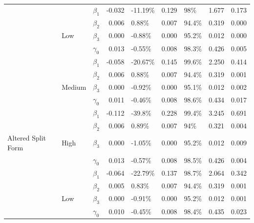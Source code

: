 \documentclass{svjour3}\usepackage[]{graphicx}\usepackage[]{color}
\newenvironment{knitrout}{}{} %
\begin{document}
\begin{knitrout}
\begin{table}[!h]
{\begin{tabular}[t]{l|l|l|r|l|r|l|r|r}
 &  & $\beta_1$ & -0.032 & -11.19\% & 0.129 & 98\% & 1.677 & 0.173\\

 &  & $\beta_2$ & 0.006 & 0.88\% & 0.007 & 94.4\% & 0.319 & 0.000\\

 & \multirow{-4}{*}{\raggedright\arraybackslash Low} & $\beta_3$ & 0.000 & -0.88\% & 0.000 & 95.2\% & 0.012 & 0.000\\

 &  & $\gamma_0$ & 0.013 & -0.55\% & 0.008 & 98.3\% & 0.426 & 0.005\\

 &  & $\beta_1$ & -0.058 & -20.67\% & 0.145 & 99.6\% & 2.250 & 0.414\\

 &  & $\beta_2$ & 0.006 & 0.88\% & 0.007 & 94.4\% & 0.319 & 0.001\\

 & \multirow{-4}{*}{\raggedright\arraybackslash Medium} & $\beta_3$ & 0.000 & -0.92\% & 0.000 & 95.1\% & 0.012 & 0.002\\

 &  & $\gamma_0$ & 0.011 & -0.46\% & 0.008 & 98.6\% & 0.434 & 0.017\\

 &  & $\beta_1$ & -0.112 & -39.8\% & 0.228 & 99.4\% & 3.245 & 0.691\\

 &  & $\beta_2$ & 0.006 & 0.89\% & 0.007 & 94\% & 0.321 & 0.004\\

\multirow{-12}{*}{\raggedright\arraybackslash Altered Split Form} & \multirow{-4}{*}{\raggedright\arraybackslash High} & $\beta_3$ & 0.000 & -1.05\% & 0.000 & 95.2\% & 0.012 & 0.009\\
\cline{1-9}
 &  & $\gamma_0$ & 0.013 & -0.57\% & 0.008 & 98.5\% & 0.426 & 0.004\\

 &  & $\beta_1$ & -0.064 & -22.79\% & 0.137 & 98.7\% & 2.064 & 0.342\\

 &  & $\beta_2$ & 0.005 & 0.83\% & 0.007 & 94.4\% & 0.319 & 0.001\\

 & \multirow{-4}{*}{\raggedright\arraybackslash Low} & $\beta_3$ & 0.000 & -0.91\% & 0.000 & 95.2\% & 0.012 & 0.001\\

 &  & $\gamma_0$ & 0.010 & -0.45\% & 0.008 & 98.4\% & 0.435 & 0.023\\


\end{tabular}}
\end{table}
\end{knitrout}
\end{document}
